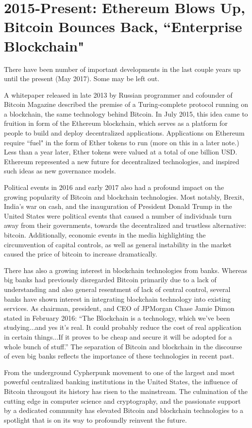 \documentclass[11pt]{article}
\begin{document}
    \section*{2015-Present: Ethereum Blows Up, Bitcoin Bounces Back, ``Enterprise Blockchain"}
    
    There have been number of important developments in the last couple years up until the present (May 2017). Some may be left out.
    
    A whitepaper released in late 2013 by Russian programmer and cofounder of Bitcoin Magazine described the premise of a Turing-complete protocol running on a blockchain, the same technology behind Bitcoin. In July 2015, this idea came to fruition in form of the Ethereum blockchain, which serves as a platform for people to build and deploy decentralized applications. Applications on Ethereum require ``fuel" in the form of Ether tokens to run (more on this in a later note.) Less than a year later, Ether tokens were valued at a total of one billion USD. Ethereum represented a new future for decentralized technologies, and inspired such ideas as new governance models.
    
    Political events in 2016 and early 2017 also had a profound impact on the growing popularity of Bitcoin and blockchain technologies. Most notably, Brexit, India's war on cash, and the inauguration of President Donald Trump in the United States were political events that caused a number of individuals turn away from their governments, towards the decentralized and trustless alternative: bitcoin. Additionally, economic events in the media highlighting the circumvention of capital controls, as well as general instability in the market caused the price of bitcoin to increase dramatically.
    
    There has also a growing interest in blockchain technologies from banks. Whereas big banks had previously disregarded Bitcoin primarily due to a lack of understanding and also general resentment of lack of central control, several banks have shown interest in integrating blockchain technology into existing services. As chairman, president, and CEO of JPMorgan Chase Jamie Dimon stated in February 2016: ``The Blockchain is a technology, which we've been studying...and yes it's real. It could probably reduce the cost of real application in certain things...If it proves to be cheap and secure it will be adopted for a whole bunch of stuff.'' The separation of Bitcoin and blockchain in the discourse of even big banks reflects the importance of these technologies in recent past.
    
    From the underground Cypherpunk movement to one of the largest and most powerful centralized banking institutions in the United States, the influence of Bitcoin througout its history has risen to the mainstream. The culmination of the cutting edge in computer science and cryptography, and the passionate support by a dedicated community has elevated Bitcoin and blockchain technologies to a spotlight that is on its way to profoundly reinvent the future.
\end{document}
